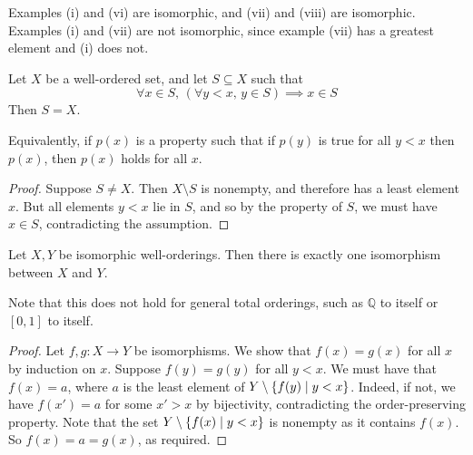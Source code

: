 Examples (i) and (vi) are isomorphic, and (vii) and (viii) are isomorphic.
Examples (i) and (vii) are not isomorphic, since example (vii) has a greatest element and (i) does not.
\begin{proposition}
    Let \( X \) be a well-ordered set, and let \( S \subseteq X \) such that
    \[ \forall x \in S,\,(\forall y < x,\, y \in S) \implies x \in S \]
    Then \( S = X \).
\end{proposition}
\begin{remark}
    Equivalently, if \( p(x) \) is a property such that if \( p(y) \) is true for all \( y < x \) then \( p(x) \), then \( p(x) \) holds for all \( x \).
\end{remark}
\begin{proof}
    Suppose \( S \neq X \).
    Then \( X \setminus S \) is nonempty, and therefore has a least element \( x \).
    But all elements \( y < x \) lie in \( S \), and so by the property of \( S \), we must have \( x \in S \), contradicting the assumption.
\end{proof}
\begin{proposition}
    Let \( X, Y \) be isomorphic well-orderings.
    Then there is exactly one isomorphism between \( X \) and \( Y \).
\end{proposition}
Note that this does not hold for general total orderings, such as \( \mathbb Q \) to itself or \( [0,1] \) to itself.
\begin{proof}
    Let \( f, g \colon X \to Y \) be isomorphisms.
    We show that \( f(x) = g(x) \) for all \( x \) by induction on \( x \).
    Suppose \( f(y) = g(y) \) for all \( y < x \).
    We must have that \( f(x) = a \), where \( a \) is the least element of \( Y \setminus \qty{f(y) \mid y < x} \).
    Indeed, if not, we have \( f(x') = a \) for some \( x' > x \) by bijectivity, contradicting the order-preserving property.
    Note that the set \( Y \setminus \qty{f(x) \mid y < x} \) is nonempty as it contains \( f(x) \).
    So \( f(x) = a = g(x) \), as required.
\end{proof}

